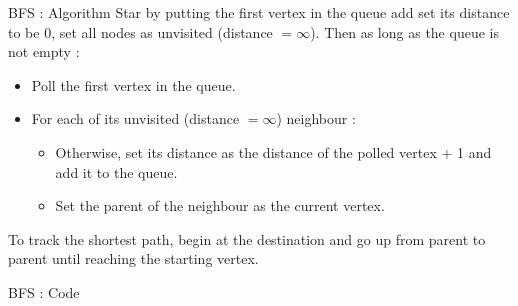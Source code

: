 \documentclass[handout,code={Graphs I},title={Introduction, DFS, BFS}]{../share/cpslide}
\begin{document}
\begin{frame}{BFS : Algorithm}
Star by putting the first vertex in the queue add set its distance to be $0$, set all nodes as unvisited (distance $= \infty$). Then as long as the queue is not empty :
\begin{itemize}
\item Poll the first vertex in the queue.
\item For each of its unvisited (distance $= \infty$) neighbour :\\
\begin{itemize}
	\item Otherwise, set its distance as the distance of the polled vertex + 1 and add it to the queue.
	\item Set the parent of the neighbour as the current vertex.
\end{itemize}
\end{itemize}
To track the shortest path, begin at the destination and go up from parent to parent until reaching the starting vertex.
\end{frame}

\begin{frame}{BFS : Code}
\end{frame}


\end{document}
